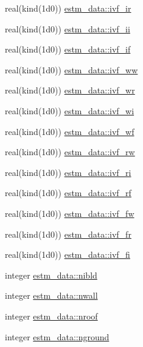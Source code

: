 \begin{DoxyCompactItemize}
\item 
real(kind(1d0)) \hyperlink{namespaceestm__data_ab659d135eedc3bab580f60e45e10ea7c}{estm\+\_\+data\+::ivf\+\_\+ir}
\item 
real(kind(1d0)) \hyperlink{namespaceestm__data_a1143a11453932046e1418817b274ca99}{estm\+\_\+data\+::ivf\+\_\+ii}
\item 
real(kind(1d0)) \hyperlink{namespaceestm__data_aa4a8abb93e606a189276a500f27cd503}{estm\+\_\+data\+::ivf\+\_\+if}
\item 
real(kind(1d0)) \hyperlink{namespaceestm__data_aae1ab3ae31af3a3a39bfc76c3ba8a3f1}{estm\+\_\+data\+::ivf\+\_\+ww}
\item 
real(kind(1d0)) \hyperlink{namespaceestm__data_ae31b6c07de2519af3d053132ab347cb4}{estm\+\_\+data\+::ivf\+\_\+wr}
\item 
real(kind(1d0)) \hyperlink{namespaceestm__data_a9d33b951364de9c96e2dfc357f5f05b6}{estm\+\_\+data\+::ivf\+\_\+wi}
\item 
real(kind(1d0)) \hyperlink{namespaceestm__data_a128bd45a4f54f0a88d5766f4279149b4}{estm\+\_\+data\+::ivf\+\_\+wf}
\item 
real(kind(1d0)) \hyperlink{namespaceestm__data_ad040589ab34bca345b5bc4004048bed1}{estm\+\_\+data\+::ivf\+\_\+rw}
\item 
real(kind(1d0)) \hyperlink{namespaceestm__data_a15423f952e1c9866ae15180ff4e08244}{estm\+\_\+data\+::ivf\+\_\+ri}
\item 
real(kind(1d0)) \hyperlink{namespaceestm__data_a3353758e0f87a694352d364605c265cd}{estm\+\_\+data\+::ivf\+\_\+rf}
\item 
real(kind(1d0)) \hyperlink{namespaceestm__data_a8076ec4c1665548b2e7641b569e39efc}{estm\+\_\+data\+::ivf\+\_\+fw}
\item 
real(kind(1d0)) \hyperlink{namespaceestm__data_a446124d1b0c7c3982f913863e8b118ac}{estm\+\_\+data\+::ivf\+\_\+fr}
\item 
real(kind(1d0)) \hyperlink{namespaceestm__data_aa3243d478e5262855b7f5a1eefdf2ab7}{estm\+\_\+data\+::ivf\+\_\+fi}
\item 
integer \hyperlink{namespaceestm__data_a2c79bef2a37b73c20e9e9531cc84f2a2}{estm\+\_\+data\+::nibld}
\item 
integer \hyperlink{namespaceestm__data_a736fcc4e8ebcaaebce24ee35abc0914e}{estm\+\_\+data\+::nwall}
\item 
integer \hyperlink{namespaceestm__data_a1510b42e476421a5d5e5bf62fcf78173}{estm\+\_\+data\+::nroof}
\item 
integer \hyperlink{namespaceestm__data_aa85aac6c0317e29416f627b48f11fb51}{estm\+\_\+data\+::nground}

\end{DoxyCompactItemize}
